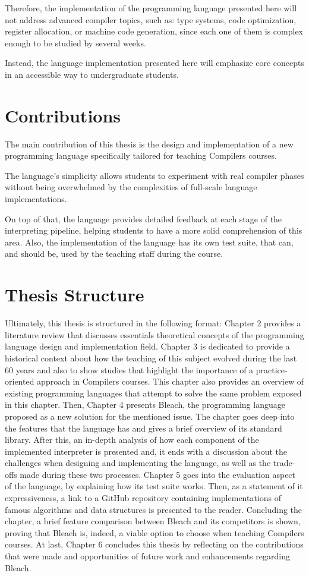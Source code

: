 Therefore, the implementation of the programming language presented here will not address advanced compiler topics, such as: type systems, code optimization, register allocation, or machine code generation, since each one of them is complex enough to be studied by several weeks.

Instead, the language implementation presented here will emphasize core concepts in an accessible way to undergraduate students.

\section{Contributions}
The main contribution of this thesis is the design and implementation of a new programming language specifically tailored for teaching Compilers courses.

The language’s simplicity allows students to experiment with real compiler phases without being overwhelmed by the complexities of full-scale language implementations.

On top of that, the language provides detailed feedback at each stage of the interpreting pipeline, helping students to have a more solid comprehension of this area. Also, the implementation of the language has its own test suite, that can, and should be, used by the teaching staff during the course.

\section{Thesis Structure}
Ultimately, this thesis is structured in the following format: Chapter 2 provides a literature review that discusses essentials theoretical concepts of the programming language design and implementation field. Chapter 3 is dedicated to provide a historical context about how the teaching of this subject evolved during the last 60 years and also to show studies that highlight the importance of a practice-oriented approach in Compilers courses. This chapter also provides an overview of existing programming languages that attempt to solve the same problem exposed in this chapter. Then, Chapter 4 presents Bleach, the programming language proposed as a new solution for the mentioned issue. The chapter goes deep into the features that the language has and gives a brief overview of its standard library. After this, an in-depth analysis of how each component of the implemented interpreter is presented and, it ends with a discussion about the challenges when designing and implementing the language, as well as the trade-offs made during these two processes. Chapter 5 goes into the evaluation aspect of the language, by explaining how its test suite works. Then, as a statement of it expressiveness, a link to a GitHub repository containing implementations of famous algorithms and data structures is presented to the reader. Concluding the chapter, a brief feature comparison between Bleach and its competitors is shown, proving that Bleach is, indeed, a viable option to choose when teaching Compilers courses. At last, Chapter 6 concludes this thesis by reflecting on the contributions that were made and opportunities of future work and enhancements regarding Bleach.